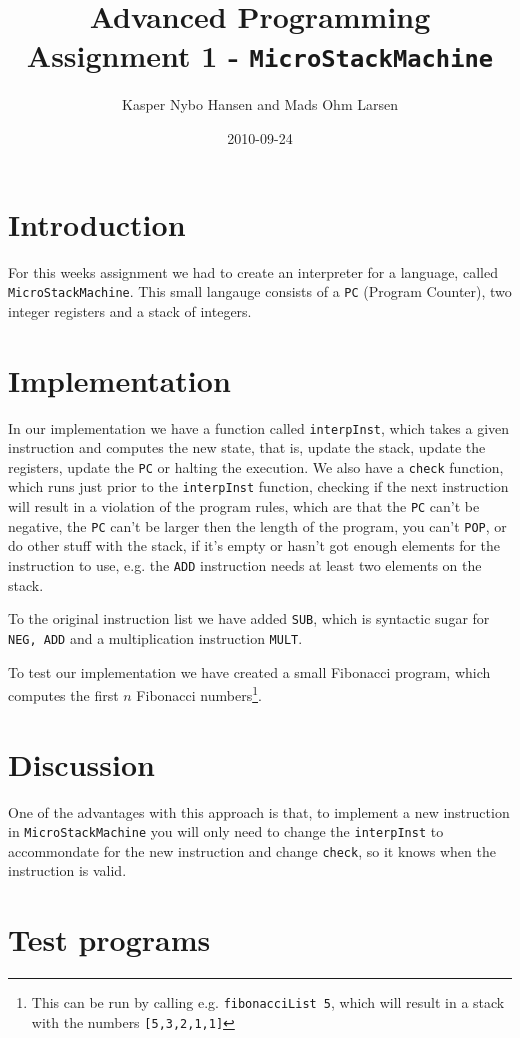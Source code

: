 \documentclass[10pt, a4paper]{article}
\title{Advanced Programming \\\small{Assignment 1} - \texttt{MicroStackMachine}}
\author{Kasper Nybo Hansen and Mads Ohm Larsen}
\date{2010-09-24}
\begin{document}
	
\maketitle
\section{Introduction}
For this weeks assignment we had to create an interpreter for a language, called \texttt{MicroStackMachine}.
This small langauge consists of a \texttt{PC} (Program Counter), two integer registers and a stack of integers.

\section{Implementation}
In our implementation we have a function called \texttt{interpInst}, which takes a given instruction and computes the new state, that is, update the stack, update the registers, update the \texttt{PC} or halting the execution.
We also have a \texttt{check} function, which runs just prior to the \texttt{interpInst} function, checking if the next instruction will result in a violation of the program rules, which are that the \texttt{PC} can't be negative, the \texttt{PC} can't be larger then the length of the program, you can't \texttt{POP}, or do other stuff with the stack, if it's empty or hasn't got enough elements for the instruction to use, e.g. the \texttt{ADD} instruction needs at least two elements on the stack.

To the original instruction list we have added \texttt{SUB}, which is syntactic sugar for \texttt{NEG, ADD} and a multiplication instruction \texttt{MULT}.

To test our implementation we have created a small Fibonacci program, which computes the first $n$ Fibonacci numbers\footnote{This can be run by calling e.g. \texttt{fibonacciList 5}, which will result in a stack with the numbers \texttt{[5,3,2,1,1]}}.

\section{Discussion}
One of the advantages with this approach is that, to implement a new instruction in \texttt{MicroStackMachine} you will only need to change the \texttt{interpInst} to accommondate for the new instruction and change \texttt{check}, so it knows when the instruction is valid.

\section{Test programs}
\end{document}
